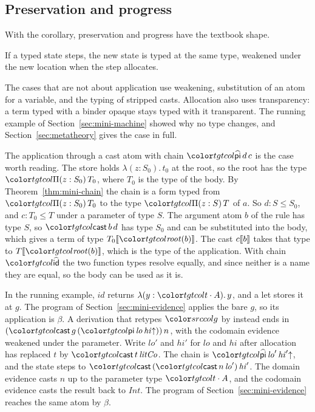 \FloatBarrier
\subsection{Preservation and progress}\label{sec:mini-safety}

With the corollary, preservation and progress have the textbook shape.

\begin{theorem}[Preservation]
If a typed state steps, the new state is typed at the same type, weakened under the new location when the step allocates.
\end{theorem}

The cases that are not about application use weakening, substitution of an atom for a variable, and the typing of stripped casts. Allocation also uses transparency: a term typed with a binder opaque stays typed with it transparent. The running example of Section~\ref{sec:mini-machine} showed why no type changes, and Section~\ref{sec:metatheory} gives the case in full.

The application through a cast atom with chain $\form{pi}\,d\,c$ is the case worth reading. The store holds $\lambda(z : S_0).\,t_0$ at the root, so the root has the type $\pit[z]{S_0}{T_0}$, where $T_0$ is the type of the body. By Theorem~\ref{thm:mini-chain} the chain is a form typed from $\pit[z]{S_0}{T_0}$ to the type $\pit[z]{S}{T}$ of $a$. So $d : S \le S_0$, and $c : T_0 \le T$ under a parameter of type $S$. The argument atom $b$ of the rule has type $S$, so $\ev{cast}\,b\,d$ has type $S_0$ and can be substituted into the body, which gives a term of type $\inst{T_0}{\rt{b}}$. The cast $c\llbracket b\rrbracket$ takes that type to $\inst{T}{\rt{b}}$, which is the type of the application. With chain $\form{id}$ the two function types resolve equally, and since neither is a name they are equal, so the body can be used as it is.

In the running example, $\mathit{id}$ returns $\lambda(y : \sel{t}{A}).\,y$, and a let stores it at $g$. The program of Section~\ref{sec:mini-evidence} applies the bare $g$, so its application is $\beta$. A derivation that retypes $\src{g}$ by  instead ends in $(\ev{cast}\,g\,(\ev{pi}\,\mathit{lo}\,\weak{\mathit{hi}}))\,n$, with the codomain evidence weakened under the parameter. Write $\mathit{lo}'$ and $\mathit{hi}'$ for $\mathit{lo}$ and $\mathit{hi}$ after allocation has replaced $t$ by $\ev{cast}\,t\,\mathit{litCo}$. The chain is $\form{pi}\,\mathit{lo}'\,\weak{\mathit{hi}'}$, and the state steps to $\ev{cast}\,(\ev{cast}\,n\,\mathit{lo}')\,\mathit{hi}'$. The domain evidence casts $n$ up to the parameter type $\sel{t}{A}$, and the codomain evidence casts the result back to $\mathit{Int}$. The program of Section~\ref{sec:mini-evidence} reaches the same atom by $\beta$.

